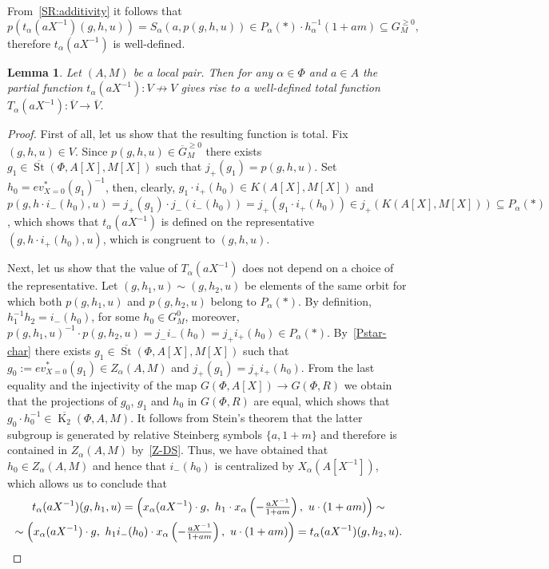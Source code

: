 \documentclass[oneside, 8pt]{amsart}
\newtheorem{lemma}{Lemma}
\theoremstyle{remark}
\theoremstyle{definition}
\numberwithin{lemma}{section}
\numberwithin{prop}{section}
\numberwithin{corollary}{section}
\DeclareMathOperator{\St}{St}
\DeclareMathOperator{\K}{K}
\numberwithin{equation}{section}
\begin{document}
From~\cref{SR:additivity} it follows that
\[p\left(t_\alpha(aX^{-1}) (g, h, u)\right) = S_\alpha(a, p(g, h, u)) \in P_\alpha(*) \cdot h_{\alpha}^{-1}(1+am) \subseteq G_M^{\geq 0},\]
therefore $t_\alpha(aX^{-1})$ is well-defined.

\begin{lemma}\label{lem:orbit-action} Let $(A, M)$ be a local pair. 
Then for any $\alpha \in \Phi$ and $a \in A$ the partial function $t_\alpha(aX^{-1}) \colon V \not \to V$ gives rise to a well-defined total function $T_\alpha(aX^{-1}) \colon \overline{V} \to \overline{V}$. \end{lemma}
\begin{proof}
 First of all, let us show that the resulting function is total. 
 Fix $(g, h, u) \in V$. Since $p(g, h, u) \in \overline{G}^{\geq 0}_M$ there exists $g_1 \in \overline{\St}(\Phi, A[X], M[X])$ such that $j_+(g_1) = p(g, h, u).$
 Set $h_0 = ev^*_{X=0}(g_1)^{-1}$, then, clearly, $g_1 \cdot i_+(h_0) \in K(A[X], M[X])$ and 
 $p(g, h \cdot i_-(h_0), u) = j_+(g_1) \cdot j_-(i_-(h_0)) = j_+(g_1 \cdot i_+(h_0)) \in j_+(K(A[X], M[X])) \subseteq P_\alpha(*)$, which shows that $t_\alpha(aX^{-1})$ is defined on the representative $(g, h \cdot i_+(h_0), u)$, which is congruent to $(g, h, u)$.
  
 Next, let us show that the value of $T_\alpha(aX^{-1})$ does not depend on a choice of the representative.
 Let $(g, h_1, u) \sim (g, h_2, u)$ be elements of the same orbit for which both $p(g, h_1, u)$ and $p(g, h_2, u)$ belong to $P_\alpha(*)$.
 By definition, $h_1^{-1} h_2 = i_-(h_0)$, for some $h_0 \in G^0_M$, moreover, 
  $p(g, h_1, u)^{-1} \cdot p(g, h_2, u) = j_- i_-(h_0) = j_+ i_+(h_0) \in P_\alpha(*)$.
 By~\cref{Pstar-char} there exists $g_1 \in \overline{\St}(\Phi, A[X], M[X])$ such that $g_0 := ev^*_{X=0}(g_1) \in Z_\alpha(A, M)$ and $j_+(g_1) = j_+ i_+ (h_0)$.
 From the last equality and the injectivity of the map $G(\Phi, A[X]) \to G(\Phi, R)$ we obtain that the projections of $g_0$, $g_1$ and $h_0$ in $G(\Phi, R)$ are equal, which shows that $g_0 \cdot h_0^{-1} \in \overline{\K_2}(\Phi, A, M)$. It follows from Stein's theorem that the latter subgroup is generated by relative Steinberg symbols $\{ a, 1 + m \}$ and therefore is contained in $Z_\alpha(A, M)$ by~\cref{Z-DS}. Thus, we have obtained that $h_0 \in Z_\alpha(A, M)$ and hence that $i_-(h_0)$ is centralized by $X_\alpha(A[X^{-1}])$, which allows us to conclude that
 \begin{multline} \nonumber
  t_\alpha(aX^{-1})(g, h_1, u) = \left( x_\alpha(aX^{-1})\cdot g ,\ h_1 \cdot x_\alpha\left(-\tfrac{aX^{-1}}{1 + am}\right),\ u \cdot (1 + am)\right) \sim \\
  \sim \left( x_\alpha(aX^{-1})\cdot g ,\ h_1 i_-(h_0) \cdot x_\alpha\left(-\tfrac{aX^{-1}}{1 + am}\right),\ u \cdot (1 + am)\right) = t_\alpha(aX^{-1})(g, h_2, u). \qedhere
 \end{multline} \end{proof}
\end{document}
